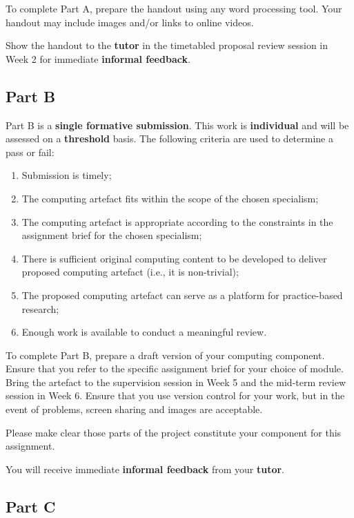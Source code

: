 \documentclass{../../fal_assignment}
\begin{document}
To complete Part A, prepare the handout using any word processing tool.
Your handout may include images and/or links to online videos.

Show the handout to the \textbf{tutor} in the timetabled proposal review session in Week 2 for immediate \textbf{informal feedback}.

\subsection*{Part B}

Part B is a \textbf{single formative submission}. This work is \textbf{individual} and will be assessed on a \textbf{threshold} basis. The following criteria are used to determine a pass or fail:

\begin{enumerate}[label=(\alph*)]
	\item Submission is timely;
	\item The computing artefact fits within the scope of the chosen specialism;
	\item The computing artefact is appropriate according to the constraints in the assignment brief for the chosen specialism;
	\item There is sufficient original computing content to be developed to deliver proposed computing artefact (i.e., it is non-trivial);
	\item The proposed computing artefact can serve as a platform for practice-based research;
	\item Enough work is available to conduct a meaningful review.
\end{enumerate}

To complete Part B, prepare a draft version of your computing component. Ensure that you refer to the specific assignment brief for your choice of module.
Bring the artefact to the supervision session in Week 5 and the mid-term review session in Week 6. Ensure that you use version control for your work, but in the event of problems, screen sharing and images are acceptable.

Please make clear those parts of the project constitute your component for this assignment.

You will receive immediate \textbf{informal feedback} from your \textbf{tutor}.

\subsection*{Part C}
\end{document}
